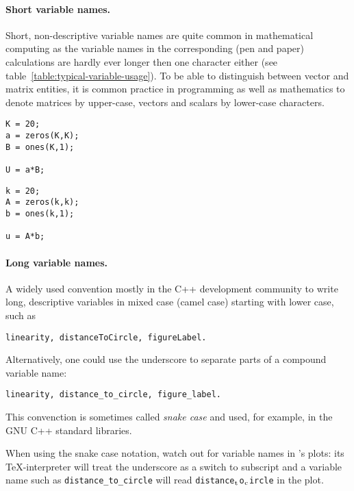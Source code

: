 \paragraph{Short variable names.}
Short, non-descriptive variable names are quite common in mathematical
computing as the variable names in the corresponding (pen and paper)
calculations are hardly ever longer then one character either (see
table~\ref{table:typical-variable-usage}). To be able to distinguish between
vector and matrix entities, it is common practice in programming as well as
mathematics to denote matrices by upper-case, vectors and scalars by lower-case
characters.

\hfill
\begin{minipage}[t]{.45\textwidth}
\begin{lstlisting}[framerule=2pt,rulecolor=\color{badred}]
K = 20;
a = zeros(K,K);
B = ones(K,1);

U = a*B;
\end{lstlisting}
\end{minipage}
\hfill
\begin{minipage}[t]{.45\textwidth}
\begin{lstlisting}[framerule=2pt,rulecolor=\color{goodgreen}]
k = 20;
A = zeros(k,k);
b = ones(k,1);

u = A*b;
\end{lstlisting}
\end{minipage}
\hfill


\paragraph{Long variable names.}
A widely used convention mostly in the C++ development community to write
long, descriptive variables in mixed case (camel case) starting with lower
case, such as
\begin{lstlisting}
linearity, distanceToCircle, figureLabel.
\end{lstlisting}
Alternatively, one could use the underscore to separate parts of a compound
variable name:
\begin{lstlisting}
linearity, distance_to_circle, figure_label.
\end{lstlisting}
This convenction is sometimes called \emph{snake case} and used, for example,
in the GNU C++ standard libraries.


When using the snake case notation, watch out for variable names in
\matlab{}'s plots: its \TeX-interpreter will treat the underscore as a switch
to subscript and a variable name such as \lstinline!distance_to_circle! will
read
\lstinline!distance!$_{\text{\lstinline!t!}}$\lstinline!o!$_{\text{\lstinline!c!}}$\lstinline!ircle!
in the plot.

